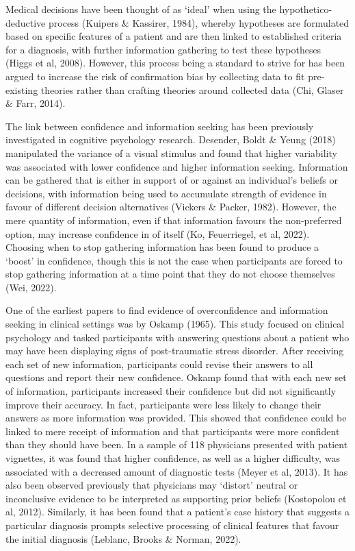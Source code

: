 \documentclass[a4paper, nobind]{templates/ociamthesis}
\begin{document}
Medical decisions have been thought of as `ideal' when using the hypothetico-deductive process (Kuipers \& Kassirer, 1984), whereby hypotheses are formulated based on specific features of a patient and are then linked to established criteria for a diagnosis, with further information gathering to test these hypotheses (Higgs et al, 2008). However, this process being a standard to strive for has been argued to increase the risk of confirmation bias by collecting data to fit pre-existing theories rather than crafting theories around collected data (Chi, Glaser \& Farr, 2014).

The link between confidence and information seeking has been previously investigated in cognitive psychology research. Desender, Boldt \& Yeung (2018) manipulated the variance of a visual stimulus and found that higher variability was associated with lower confidence and higher information seeking. Information can be gathered that is either in support of or against an individual's beliefs or decisions, with information being used to accumulate strength of evidence in favour of different decision alternatives (Vickers \& Packer, 1982). However, the mere quantity of information, even if that information favours the non-preferred option, may increase confidence in of itself (Ko, Feuerriegel, et al, 2022). Choosing when to stop gathering information has been found to produce a `boost' in confidence, though this is not the case when participants are forced to stop gathering information at a time point that they do not choose themselves (Wei, 2022).

One of the earliest papers to find evidence of overconfidence and information seeking in clinical settings was by Oskamp (1965). This study focused on clinical psychology and tasked participants with answering questions about a patient who may have been displaying signs of post-traumatic stress disorder. After receiving each set of new information, participants could revise their answers to all questions and report their new confidence. Oskamp found that with each new set of information, participants increased their confidence but did not significantly improve their accuracy. In fact, participants were less likely to change their answers as more information was provided. This showed that confidence could be linked to mere receipt of information and that participants were more confident than they should have been. In a sample of 118 physicians presented with patient vignettes, it was found that higher confidence, as well as a higher difficulty, was associated with a decreased amount of diagnostic tests (Meyer et al, 2013). It has also been observed previously that physicians may `distort' neutral or inconclusive evidence to be interpreted as supporting prior beliefs (Kostopolou et al, 2012). Similarly, it has been found that a patient's case history that suggests a particular diagnosis prompts selective processing of clinical features that favour the initial diagnosis (Leblanc, Brooks \& Norman, 2022).
\end{document}
